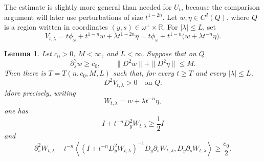 \documentclass[11pt]{article}
\numberwithin{equation}{section}
\newtheorem{lemma}[theorem]{Lemma}
\newcommand{\R}{\mathbb R}
\begin{document}
The estimate is slightly more general than needed for \(U_t\), because the comparison argument will later use perturbations of size \(t^{1-2n}\).  Let \(w,\eta\in C^2(Q)\), where \(Q\) is a region written in coordinates \((y,s)\in\omega^\perp\times\R\).  For \(|\lambda|\le L\), set
\begin{equation}\label{eq:perturbed-approx-profile}
    V_{t,\lambda}
    =
    t\phi_\omega+t^{1-n}w+\lambda t^{1-2n}\eta
    =
    t\phi_\omega+t^{1-n}\bigl(w+\lambda t^{-n}\eta\bigr).
\end{equation}

\begin{lemma}\label{lem:schur-convexity-criterion}
Let \(c_0>0\), \(M<\infty\), and \(L<\infty\).  Suppose that on \(Q\)
\begin{equation}\label{eq:convexity-hypotheses-general}
    \partial_s^2 w\ge c_0,
    \qquad
    \|D^2w\|+\|D^2\eta\|\le M .
\end{equation}
Then there is \(T=T(n,c_0,M,L)\) such that, for every \(t\ge T\) and every \(|\lambda|\le L\),
\[
    D^2V_{t,\lambda}>0
    \quad\text{on }Q.
\]
More precisely, writing
\[
    W_{t,\lambda}=w+\lambda t^{-n}\eta,
\]
one has
\begin{equation}\label{eq:convexity-transverse-block}
    I+t^{-n}D_y^2W_{t,\lambda}
    \ge \frac12 I
\end{equation}
and
\begin{equation}\label{eq:convexity-schur-lower}
    \partial_s^2W_{t,\lambda}
    -t^{-n}
    \left\langle
        (I+t^{-n}D_y^2W_{t,\lambda})^{-1}D_y\partial_sW_{t,\lambda},
        D_y\partial_sW_{t,\lambda}
    \right\rangle
    \ge \frac{c_0}{2} .
\end{equation}
\end{lemma}
\end{document}
